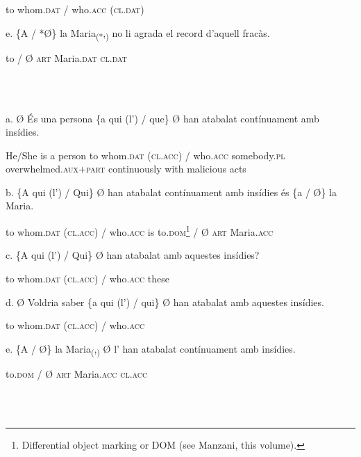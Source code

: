 \documentclass[output=paper,modfonts,nonflat]{langsci/langscibook}
\begin{document}
                                          to whom.\textsc{dat} /   who.\textsc{acc}      (\textsc{cl.dat})

        e. \{A / *Ø\} la    Maria\textsubscript{(*},\textsubscript{)}    no li         agrada el record d’aquell fracàs.

              to /   Ø  \textsc{art} Maria.\textsc{dat}     \textsc{cl.dat}

\ea%
    \label{ex:key:16}
    \gll\\
        \\
    \glt
    \z

          a. Ø        És una persona \{a  qui             (l’)          / que\}        Ø                   han atabalat                      contínuament amb insídies.

                He/She is  a    person   to whom.\textsc{dat} (\textsc{cl.acc}) / who.\textsc{acc} somebody.\textsc{pl} overwhelmed.\textsc{aux}+\textsc{part} continuously with malicious acts

           b. \{A  qui             (l’)          / Qui\}       Ø han atabalat contínuament amb insídies és \{a              / Ø\} la    Maria.

                 to whom.\textsc{dat} (\textsc{cl.acc}) / who.\textsc{acc}                                                                     is   to.\textsc{dom}\footnote{Differential object marking or DOM (see Manzani, this volume).} / Ø  \textsc{art} Maria.\textsc{acc}

        c. \{A  qui             (l’)          / Qui\}       Ø han atabalat amb aquestes insídies?

             to whom.\textsc{dat} (\textsc{cl.acc}) / who.\textsc{acc}                                 these

          d. Ø Voldria saber \{a  qui              (l’)          / qui\}        Ø han atabalat amb aquestes insídies.

                                          to whom.\textsc{dat} (\textsc{cl.acc}) / who.\textsc{acc}                            

          e. \{A         / Ø\} la   Maria\textsubscript{(},\textsubscript{)}      Ø l’         han atabalat contínuament amb insídies.

               to.\textsc{dom} / Ø  \textsc{art} Maria.\textsc{acc}     \textsc{cl.acc}

\ea%
    \label{ex:key:17}
    \gll\\
        \\
    \glt
    \z
\end{document}
